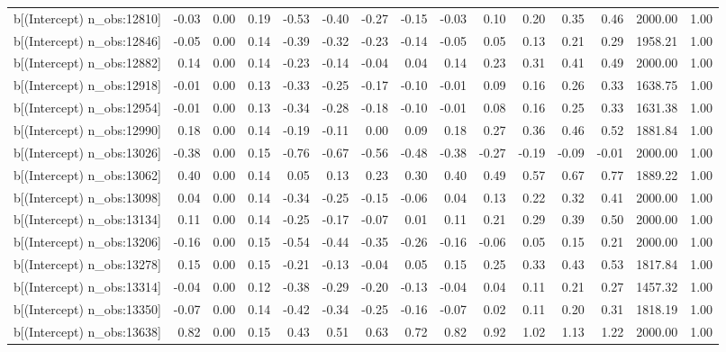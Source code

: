 \begin{table}[ht]
\begin{tabular}{rrrrrrrrrrrrrrr}
  b[(Intercept) n\_obs:12810] & -0.03 & 0.00 & 0.19 & -0.53 & -0.40 & -0.27 & -0.15 & -0.03 & 0.10 & 0.20 & 0.35 & 0.46 & 2000.00 & 1.00 \\ 
  b[(Intercept) n\_obs:12846] & -0.05 & 0.00 & 0.14 & -0.39 & -0.32 & -0.23 & -0.14 & -0.05 & 0.05 & 0.13 & 0.21 & 0.29 & 1958.21 & 1.00 \\ 
  b[(Intercept) n\_obs:12882] & 0.14 & 0.00 & 0.14 & -0.23 & -0.14 & -0.04 & 0.04 & 0.14 & 0.23 & 0.31 & 0.41 & 0.49 & 2000.00 & 1.00 \\ 
  b[(Intercept) n\_obs:12918] & -0.01 & 0.00 & 0.13 & -0.33 & -0.25 & -0.17 & -0.10 & -0.01 & 0.09 & 0.16 & 0.26 & 0.33 & 1638.75 & 1.00 \\ 
  b[(Intercept) n\_obs:12954] & -0.01 & 0.00 & 0.13 & -0.34 & -0.28 & -0.18 & -0.10 & -0.01 & 0.08 & 0.16 & 0.25 & 0.33 & 1631.38 & 1.00 \\ 
  b[(Intercept) n\_obs:12990] & 0.18 & 0.00 & 0.14 & -0.19 & -0.11 & 0.00 & 0.09 & 0.18 & 0.27 & 0.36 & 0.46 & 0.52 & 1881.84 & 1.00 \\ 
  b[(Intercept) n\_obs:13026] & -0.38 & 0.00 & 0.15 & -0.76 & -0.67 & -0.56 & -0.48 & -0.38 & -0.27 & -0.19 & -0.09 & -0.01 & 2000.00 & 1.00 \\ 
  b[(Intercept) n\_obs:13062] & 0.40 & 0.00 & 0.14 & 0.05 & 0.13 & 0.23 & 0.30 & 0.40 & 0.49 & 0.57 & 0.67 & 0.77 & 1889.22 & 1.00 \\ 
  b[(Intercept) n\_obs:13098] & 0.04 & 0.00 & 0.14 & -0.34 & -0.25 & -0.15 & -0.06 & 0.04 & 0.13 & 0.22 & 0.32 & 0.41 & 2000.00 & 1.00 \\ 
  b[(Intercept) n\_obs:13134] & 0.11 & 0.00 & 0.14 & -0.25 & -0.17 & -0.07 & 0.01 & 0.11 & 0.21 & 0.29 & 0.39 & 0.50 & 2000.00 & 1.00 \\ 
  b[(Intercept) n\_obs:13206] & -0.16 & 0.00 & 0.15 & -0.54 & -0.44 & -0.35 & -0.26 & -0.16 & -0.06 & 0.05 & 0.15 & 0.21 & 2000.00 & 1.00 \\ 
  b[(Intercept) n\_obs:13278] & 0.15 & 0.00 & 0.15 & -0.21 & -0.13 & -0.04 & 0.05 & 0.15 & 0.25 & 0.33 & 0.43 & 0.53 & 1817.84 & 1.00 \\ 
  b[(Intercept) n\_obs:13314] & -0.04 & 0.00 & 0.12 & -0.38 & -0.29 & -0.20 & -0.13 & -0.04 & 0.04 & 0.11 & 0.21 & 0.27 & 1457.32 & 1.00 \\ 
  b[(Intercept) n\_obs:13350] & -0.07 & 0.00 & 0.14 & -0.42 & -0.34 & -0.25 & -0.16 & -0.07 & 0.02 & 0.11 & 0.20 & 0.31 & 1818.19 & 1.00 \\ 
  b[(Intercept) n\_obs:13638] & 0.82 & 0.00 & 0.15 & 0.43 & 0.51 & 0.63 & 0.72 & 0.82 & 0.92 & 1.02 & 1.13 & 1.22 & 2000.00 & 1.00 \\ 

\end{tabular}
\end{table}
